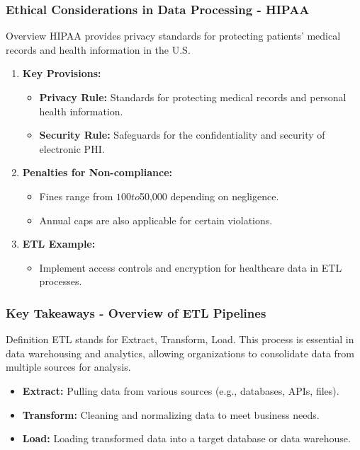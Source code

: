 \documentclass[aspectratio=169]{beamer}
\begin{document}
\begin{frame}[fragile]
    \frametitle{Ethical Considerations in Data Processing - HIPAA}
    \begin{block}{Overview}
        HIPAA provides privacy standards for protecting patients' medical records and health information in the U.S.
    \end{block}
    
    \begin{enumerate}
        \item \textbf{Key Provisions:}
        \begin{itemize}
            \item \textbf{Privacy Rule:} Standards for protecting medical records and personal health information.
            \item \textbf{Security Rule:} Safeguards for the confidentiality and security of electronic PHI.
        \end{itemize}

        \item \textbf{Penalties for Non-compliance:}
        \begin{itemize}
            \item Fines range from $100 to $50,000 depending on negligence.
            \item Annual caps are also applicable for certain violations.
        \end{itemize}

        \item \textbf{ETL Example:}
        \begin{itemize}
            \item Implement access controls and encryption for healthcare data in ETL processes.
        \end{itemize}
    \end{enumerate}
\end{frame}

\begin{frame}[fragile]
    \frametitle{Key Takeaways - Overview of ETL Pipelines}
    \begin{block}{Definition}
        ETL stands for Extract, Transform, Load. This process is essential in data warehousing and analytics, allowing organizations to consolidate data from multiple sources for analysis.
    \end{block}
    
    \begin{itemize}
        \item \textbf{Extract:} Pulling data from various sources (e.g., databases, APIs, files).
        \item \textbf{Transform:} Cleaning and normalizing data to meet business needs.
        \item \textbf{Load:} Loading transformed data into a target database or data warehouse.
    \end{itemize}
\end{frame}
\end{document}
